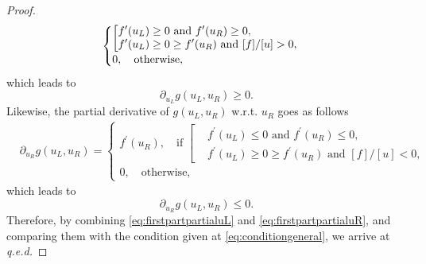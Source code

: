 \documentclass[12pt]{article}
\begin{document}
\begin{enumerate}
\begin{proof}
\begin{align*}
\begin{cases}
				      \left[
				      \begin{aligned}
					       & f^\prime(u_L) \geq 0 \text{ and } f^\prime(u_R) \geq 0,           \\
					       & f^\prime(u_L) \geq 0 \geq f^\prime(u_R) \text{ and } [f]/[u] > 0,
				      \end{aligned}
				      \right.
				      \notag \\
				      0, \quad  \text{otherwise},
			      \end{cases}
		      \end{align*}
		      which leads to
		      \begin{equation}\label{eq:firstpartpartialuL}
			      \boxed{
				      \partial_{u_L} g(u_L,u_R) \geq 0.
			      }
		      \end{equation}
		      Likewise, the partial derivative of $g(u_L,u_R)$
		      w.r.t. $u_R$ goes as follows
		      \begin{align*}
			       & \partial_{u_R} g(u_L,u_R)
			      =
			      \begin{cases}
				      f^\prime(u_R), \quad  \text{if }
				      \left[
				      \begin{aligned}
					       & f^\prime(u_L) \leq 0 \text{ and } f^\prime(u_R) \leq 0,         \\
					       & f^\prime(u_L) \geq 0 \geq f^\prime(u_R) \text{ and } [f]/[u]<0,
				      \end{aligned}
				      \right.
				      \\
				      0, \quad  \text{otherwise},
			      \end{cases}
		      \end{align*}
		      which leads to
		      \begin{equation}\label{eq:firstpartpartialuR}
			      \boxed{
				      \partial_{u_R} g(u_L,u_R) \leq 0.
			      }
		      \end{equation}
		      Therefore, by combining \eqref{eq:firstpartpartialuL} and \eqref{eq:firstpartpartialuR},
		      and comparing them with the condition given at \eqref{eq:conditiongeneral}, we arrive at \emph{q.e.d.}
	      \end{proof}
	      

\end{enumerate}
\end{document}
